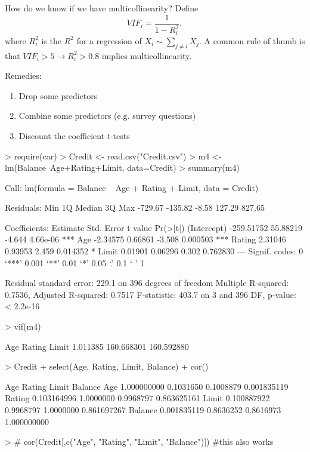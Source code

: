 \documentclass[10pt]{article}
\begin{document}
How do we know if we have multicollinearity? Define
 		$$
 			VIF_i = \frac{1}{1-R_i^2},
 		$$
 		where $R_i^2$ is the $R^2$ for a regression of $X_i \sim \sum_{j \neq i} X_j$. A common rule of thumb is that $VIF_i > 5 \rightarrow R_i^2 > 0.8$ implies multicollinearity.

Remedies:
 		\begin{enumerate}
 			\item Drop some predictors
 			\item Combine some predictors (e.g. survey questions)
 			\item Discount the coefficient $t$-tests
 		\end{enumerate}


\begin{Schunk}
\begin{Sinput}
> require(car)
> Credit <- read.csv("Credit.csv")
> m4 <- lm(Balance~Age+Rating+Limit, data=Credit)
> summary(m4)
\end{Sinput}
\begin{Soutput}
Call:
lm(formula = Balance ~ Age + Rating + Limit, data = Credit)

Residuals:
    Min      1Q  Median      3Q     Max 
-729.67 -135.82   -8.58  127.29  827.65 

Coefficients:
              Estimate Std. Error t value Pr(>|t|)    
(Intercept) -259.51752   55.88219  -4.644 4.66e-06 ***
Age           -2.34575    0.66861  -3.508 0.000503 ***
Rating         2.31046    0.93953   2.459 0.014352 *  
Limit          0.01901    0.06296   0.302 0.762830    
---
Signif. codes:  0 ‘***’ 0.001 ‘**’ 0.01 ‘*’ 0.05 ‘.’ 0.1 ‘ ’ 1

Residual standard error: 229.1 on 396 degrees of freedom
Multiple R-squared:  0.7536,	Adjusted R-squared:  0.7517 
F-statistic: 403.7 on 3 and 396 DF,  p-value: < 2.2e-16
\end{Soutput}
\begin{Sinput}
> vif(m4)
\end{Sinput}
\begin{Soutput}
       Age     Rating      Limit 
  1.011385 160.668301 160.592880 
\end{Soutput}
\begin{Sinput}
> Credit %>%
+   select(Age, Rating, Limit, Balance) %>%
+   cor()
\end{Sinput}
\begin{Soutput}
                Age    Rating     Limit     Balance
Age     1.000000000 0.1031650 0.1008879 0.001835119
Rating  0.103164996 1.0000000 0.9968797 0.863625161
Limit   0.100887922 0.9968797 1.0000000 0.861697267
Balance 0.001835119 0.8636252 0.8616973 1.000000000
\end{Soutput}
\begin{Sinput}
> # cor(Credit[,c("Age", "Rating", "Limit", "Balance")]) #this also works
\end{Sinput}
\end{Schunk}
\end{document}
